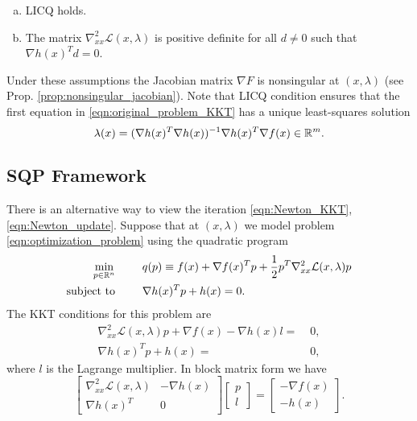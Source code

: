 \documentclass[11pt,a4paper]{article}
\begin{document}
\begin{assume}\label{assume:nonsingular_jacobian}
\leavevmode
\begin{enumerate}[(a)]
    \item LICQ holds.
    \item The matrix $\nabla^2_{xx}\mathcal{L}(x,\lambda)$ is positive definite for all $d\neq 0$ such that $\nabla h(x)^T d = 0$.
\end{enumerate}
\end{assume}
Under these assumptions the Jacobian matrix $\nabla F$ is nonsingular at $(x,\lambda)$ (see Prop. \ref{prop:nonsingular_jacobian}). Note that LICQ condition ensures that the first equation in \eqref{eqn:original_problem_KKT} has a unique least-squares solution
\begin{equation}
\lambda(x) = (\nabla h(x)^T\nabla h(x))^{-1}\nabla h(x)^T\nabla f(x)\in \mathbb{R}^m.\label{eqn:least_squares_solution_for_lambda}
\end{equation}

\subsection{SQP Framework}

There is an alternative way to view the iteration \eqref{eqn:Newton_KKT}, \eqref{eqn:Newton_update}. Suppose that at $(x,\lambda)$ we model problem \eqref{eqn:optimization_problem} using the quadratic program
\begin{alignat}{3}
\underset{p\in \mathbb{R}^n}{\text{min}}& &&q(p)\equiv f(x) + \nabla f(x)^Tp + \frac{1}{2}p^T\nabla^2_{xx}\mathcal{L}(x,\lambda)p \nonumber\\
\text{subject to}&\hspace{0.5cm} && \nabla h(x)^Tp+h(x) = 0. \label{eqn:SQP_model}
\end{alignat}
The KKT conditions for this problem are
\begin{align}
\nabla^2_{xx}\mathcal{L}(x,\lambda)p + \nabla f(x) - \nabla h(x)l =&\; 0, \nonumber \\
\nabla h(x)^Tp + h(x) =&\; 0, \label{eqn:SQP_KKT}
\end{align}
where $l$ is the Lagrange multiplier. In block matrix form we have
\begin{equation}
\left[
\begin{array}{cc} 
\nabla^2_{xx} \mathcal{L}(x,\lambda) & -\nabla h(x) \\ 
\nabla h(x)^T & 0
\end{array} \right]
\left[
\begin{array}{c} 
p \\ 
l
\end{array} \right] = 
\left[
\begin{array}{c} 
-\nabla f(x) \\ 
-h(x)
\end{array} \right]. \label{eqn:SQP_KKT_matrix_form}
\end{equation}
\end{document}
